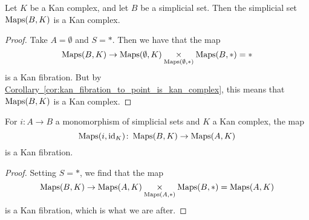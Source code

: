 \documentclass[main.tex]{subfiles}
\begin{document}
\begin{corollary}
  \label{cor:mapping_space_to_kan_complex_is_kan_complex}
  Let $K$ be a Kan complex, and let $B$ be a simplicial set. Then the simplicial set $\operatorname{Maps}(B, K)$ is a Kan complex.
\end{corollary}
\begin{proof}
  Take $A = \emptyset$ and $S = *$. Then we have that the map
  \begin{equation*}
    \operatorname{Maps}(B, K) \to \operatorname{Maps}(\emptyset, K) \underset{\operatorname{Maps}(\emptyset,*)}{\times} \operatorname{Maps}(B, *) = *
  \end{equation*}
  is a Kan fibration. But by \hyperref[cor:kan_fibration_to_point_is_kan_complex]{Corollary~\ref*{cor:kan_fibration_to_point_is_kan_complex}}, this means that $\operatorname{Maps}(B, K)$ is a Kan complex.
\end{proof}

\begin{corollary}
  \label{cor:maps_functor_preserves_kan_fibrations_in_first_slot}
  For $i\colon A \to B$ a monomorphism of simplicial sets and $K$ a Kan complex, the map
  \begin{equation*}
    \operatorname{Maps}(i, \mathrm{id}_{K})\colon \operatorname{Maps}(B, K) \to \operatorname{Maps}(A, K)
  \end{equation*}
  is a Kan fibration.
\end{corollary}
\begin{proof}
  Setting $S = *$, we find that the map
  \begin{equation*}
    \operatorname{Maps}(B, K) \to \operatorname{Maps}(A, K) \underset{\operatorname{Maps}(A, *)} \times \operatorname{Maps}(B, *) = \operatorname{Maps}(A, K)
  \end{equation*}
  is a Kan fibration, which is what we are after.
\end{proof}
\end{document}
